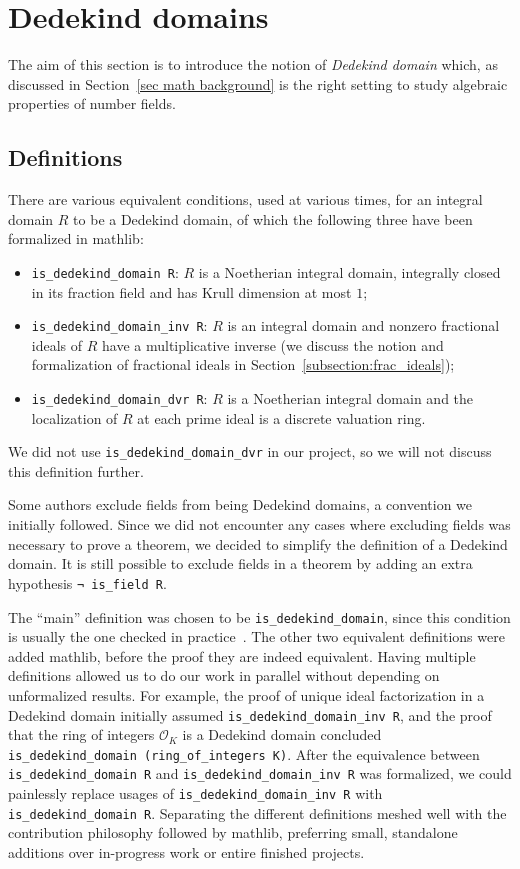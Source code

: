 \documentclass[a4paper,USenglish,cleveref, autoref, thm-restate]{lipics-v2021}
\newcommand{\lean}[1]{\texttt{#1}\xspace} %
\newcommand*{\OK}[1][K]{\mathcal{O}_{#1}}
\newcommand{\mathlib}{\textsf{mathlib}\xspace}
\begin{document}
\section{Dedekind domains} \label{sec:Dedekind-domain}
The aim of this section is to introduce the notion of \emph{Dedekind domain} which, as discussed in Section~\ref{sec math background} is the right setting to study algebraic properties of number fields.
\subsection{Definitions}\label{subsec:definitions_DD}
There are various equivalent conditions, used at various times, for an integral domain $R$ to be a Dedekind domain,
of which the following three have been formalized in \mathlib:
\begin{itemize}
\item \lean{is\_dedekind\_domain R}: $R$ is a Noetherian integral domain, integrally closed in its fraction field and has Krull dimension at most $1$;
\item \lean{is\_dedekind\_domain\_inv R}: $R$ is an integral domain and nonzero fractional ideals of $R$ have a multiplicative inverse (we discuss the notion and formalization of fractional ideals in Section~\ref{subsection:frac_ideals});
\item \lean{is\_dedekind\_domain\_dvr R}: $R$ is a Noetherian integral domain and the localization of $R$ at each prime ideal is a discrete valuation ring.
\end{itemize}
We did not use \lean{is\_dedekind\_domain\_dvr} in our project, so we will not discuss this definition further.

Some authors exclude fields from being Dedekind domains, a convention we initially followed.
Since we did not encounter any cases where excluding fields was necessary to prove a theorem,
we decided to simplify the definition of a Dedekind domain.
It is still possible to exclude fields in a theorem by adding an extra hypothesis \lean{¬ is\_field R}.

The ``main'' definition was chosen to be \lean{is\_dedekind\_domain},
since this condition is usually the one checked in practice~\cite{Neukirch}.
The other two equivalent definitions were added \mathlib, before the proof they are indeed equivalent.
Having multiple definitions allowed us to do our work in parallel without depending on unformalized results.
For example,
the proof of unique ideal factorization in a Dedekind domain initially assumed \lean{is\_dedekind\_domain\_inv R},
and the proof that the ring of integers $\OK$ is a Dedekind domain concluded \lean{is\_dedekind\_domain (ring\_of\_integers K)}.
After the equivalence between \lean{is\_dedekind\_domain R} and \lean{is\_dedekind\_domain\_inv R} was formalized,
we could painlessly replace usages of \lean{is\_dedekind\_domain\_inv R} with \lean{is\_dedekind\_domain R}.
Separating the different definitions meshed well with the contribution philosophy followed by \mathlib, preferring small, standalone additions over in-progress work or entire finished projects.
\end{document}
